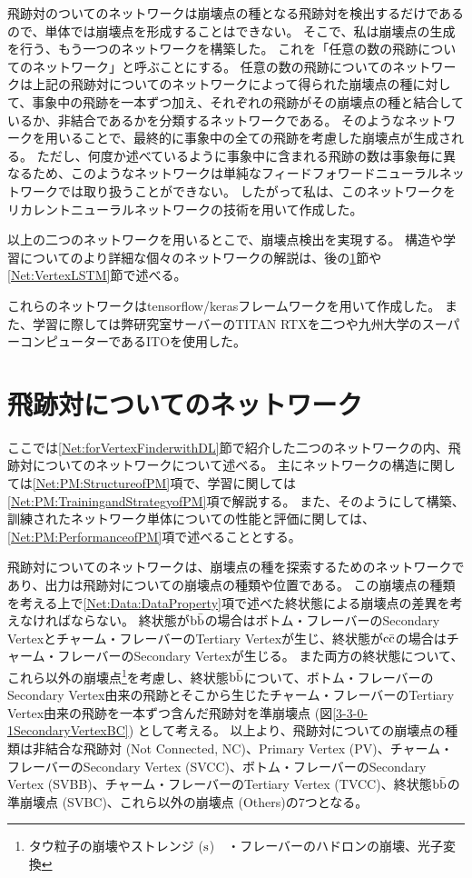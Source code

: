 飛跡対のついてのネットワークは崩壊点の種となる飛跡対を検出するだけであるので、単体では崩壊点を形成することはできない。
そこで、私は崩壊点の生成を行う、もう一つのネットワークを構築した。
これを「任意の数の飛跡についてのネットワーク」と呼ぶことにする。
任意の数の飛跡についてのネットワークは上記の飛跡対についてのネットワークによって得られた崩壊点の種に対して、事象中の飛跡を一本ずつ加え、それぞれの飛跡がその崩壊点の種と結合しているか、非結合であるかを分類するネットワークである。
そのようなネットワークを用いることで、最終的に事象中の全ての飛跡を考慮した崩壊点が生成される。
ただし、何度か述べているように事象中に含まれる飛跡の数は事象毎に異なるため、このようなネットワークは単純なフィードフォワードニューラルネットワークでは取り扱うことができない。
したがって私は、このネットワークをリカレントニューラルネットワークの技術を用いて作成した。

以上の二つのネットワークを用いるとこで、崩壊点検出を実現する。
構造や学習についてのより詳細な個々のネットワークの解説は、後の\ref{Net:PairModel}節や\ref{Net:VertexLSTM}節で述べる。

これらのネットワークはtensorflow/kerasフレームワークを用いて作成した。
また、学習に際しては弊研究室サーバーのTITAN RTXを二つや九州大学のスーパーコンピューターであるITOを使用した。

\section{飛跡対についてのネットワーク} \label{Net:PairModel}

ここでは\ref{Net:forVertexFinderwithDL}節で紹介した二つのネットワークの内、飛跡対についてのネットワークについて述べる。
主にネットワークの構造に関しては\ref{Net:PM:StructureofPM}項で、学習に関しては\ref{Net:PM:TrainingandStrategyofPM}項で解説する。
また、そのようにして構築、訓練されたネットワーク単体についての性能と評価に関しては、\ref{Net:PM:PerformanceofPM}項で述べることとする。

飛跡対についてのネットワークは、崩壊点の種を探索するためのネットワークであり、出力は飛跡対についての崩壊点の種類や位置である。
この崩壊点の種類を考える上で\ref{Net:Data:DataProperty}項で述べた終状態による崩壊点の差異を考えなければならない。
終状態が$\rm b\bar{b}$の場合はボトム・フレーバーのSecondary Vertexとチャーム・フレーバーのTertiary Vertexが生じ、終状態が$\rm c\bar{c}$の場合はチャーム・フレーバーのSecondary Vertexが生じる。
また両方の終状態について、これら以外の崩壊点\footnote{タウ粒子の崩壊やストレンジ ($\rm s$)　・フレーバーのハドロンの崩壊、光子変換}を考慮し、終状態$\rm b\bar{b}$について、ボトム・フレーバーのSecondary Vertex由来の飛跡とそこから生じたチャーム・フレーバーのTertiary Vertex由来の飛跡を一本ずつ含んだ飛跡対を準崩壊点 (図\ref{3-3-0-1SecondaryVertexBC}) として考える。
以上より、飛跡対についての崩壊点の種類は非結合な飛跡対 (Not Connected, NC)、Primary Vertex (PV)、チャーム・フレーバーのSecondary Vertex (SVCC)、ボトム・フレーバーのSecondary Vertex (SVBB)、チャーム・フレーバーのTertiary Vertex (TVCC)、終状態$\rm b\bar{b}$の準崩壊点 (SVBC)、これら以外の崩壊点 (Others)の7つとなる。

